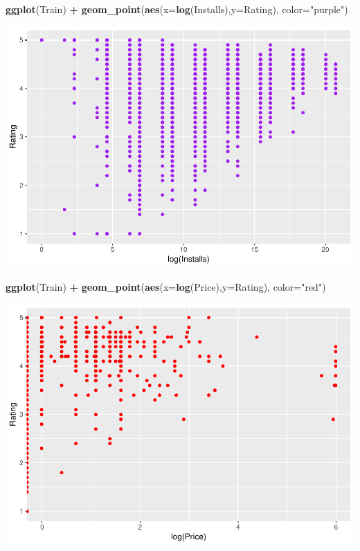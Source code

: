 \documentclass[]{article}
\newenvironment{Shaded}{\begin{snugshade}}{\end{snugshade}}
\newcommand{\DataTypeTok}[1]{\textcolor[rgb]{0.13,0.29,0.53}{#1}}
\newcommand{\KeywordTok}[1]{\textcolor[rgb]{0.13,0.29,0.53}{\textbf{#1}}}
\newcommand{\NormalTok}[1]{#1}
\newcommand{\OperatorTok}[1]{\textcolor[rgb]{0.81,0.36,0.00}{\textbf{#1}}}
\newcommand{\StringTok}[1]{\textcolor[rgb]{0.31,0.60,0.02}{#1}}
\begin{document}
\begin{Shaded}
\begin{Highlighting}[]
\KeywordTok{ggplot}\NormalTok{(Train) }\OperatorTok{+}\StringTok{ }\KeywordTok{geom_point}\NormalTok{(}\KeywordTok{aes}\NormalTok{(}\DataTypeTok{x=}\KeywordTok{log}\NormalTok{(Installs),}\DataTypeTok{y=}\NormalTok{Rating), }\DataTypeTok{color=}\StringTok{"purple"}\NormalTok{)}
\end{Highlighting}
\end{Shaded}

\includegraphics{Project_2_Work_files/figure-latex/unnamed-chunk-16-3.pdf}

\begin{Shaded}
\begin{Highlighting}[]
\KeywordTok{ggplot}\NormalTok{(Train) }\OperatorTok{+}\StringTok{ }\KeywordTok{geom_point}\NormalTok{(}\KeywordTok{aes}\NormalTok{(}\DataTypeTok{x=}\KeywordTok{log}\NormalTok{(Price),}\DataTypeTok{y=}\NormalTok{Rating), }\DataTypeTok{color=}\StringTok{"red"}\NormalTok{)}
\end{Highlighting}
\end{Shaded}

\includegraphics{Project_2_Work_files/figure-latex/unnamed-chunk-16-4.pdf}
\end{document}
